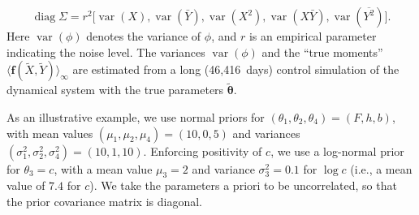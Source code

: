 \documentclass[draft]{agujournal}
\renewcommand{\vec}[1]{\boldsymbol{{#1}}}
\begin{document}
\begin{equation}\label{e:noise}
\mathop{\mathrm{diag}} \Sigma = r^2 \bigl[\mathop{\mathrm{var}}(X), \mathop{\mathrm{var}}({\bar Y}), \mathop{\mathrm{var}}({X^2}), \mathop{\mathrm{var}}({X\bar Y}), \mathop{\mathrm{var}}({\overline{Y^2}})\bigr].
\end{equation}
Here $\mathop{\mathrm{var}}(\phi)$ denotes the variance of $\phi$, and $r$ is an empirical parameter indicating the noise level. The variances $\mathop{\mathrm{var}}(\phi)$ and the ``true moments'' $\langle \vec{f}(\tilde X, \tilde Y)\rangle_\infty$ are estimated from a long (46,416~days) control simulation of the dynamical system with the true parameters $\vec{\tilde\theta}$.

As an illustrative example, we use normal priors for $(\theta_1, \theta_2, \theta_4) = (F, h, b)$, with mean values $(\mu_1, \mu_2, \mu_4) = (10, 0, 5)$ and variances $(\sigma^2_1, \sigma^2_2, \sigma^2_4) = (10, 1, 10)$. Enforcing positivity of $c$, we use a log-normal prior for $\theta_3 = c$, with a mean value $\mu_3 = 2$ and variance $\sigma_3^2 = 0.1$ for $\log c$ (i.e., a mean value of $7.4$ for $c$). We take the parameters a priori to be uncorrelated, so that the prior covariance matrix is diagonal. 
\end{document}
